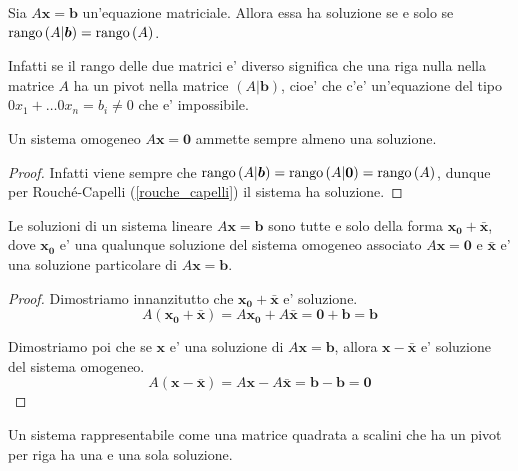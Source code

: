 \begin{theorem} \label{rouche_capelli}
    Sia $A\bm{x} = \bm b$ un'equazione matriciale. Allora essa ha soluzione se e solo se $\operatorname{rango}\left( A|\bm b \right) = \operatorname{rango}\left( A \right)$.
\end{theorem}
\begin{intuition}
    Infatti se il rango delle due matrici e' diverso significa che una riga nulla nella matrice $A$ ha un pivot nella matrice $(A|\bm b)$, cioe' che c'e' un'equazione del tipo $0x_1 + \dots 0x_n = b_i \neq 0$ che e' impossibile.
\end{intuition}

\begin{proposition}
    Un sistema omogeneo $A\bm{x} = \bm 0$ ammette sempre almeno una soluzione.
\end{proposition}
\begin{proof}
    Infatti viene sempre che $\operatorname{rango}\left( A|\bm b \right) = \operatorname{rango}\left( A|\bm 0 \right) = \operatorname{rango}\left( A \right)$, dunque per Rouché-Capelli (\ref{rouche_capelli}) il sistema ha soluzione.
\end{proof}

\begin{proposition}
    Le soluzioni di un sistema lineare $A\bm x = \bm b$ sono tutte e solo della forma $\bm{x_0} + \bm{\bar{x}}$, dove $\bm{x_0}$ e' una qualunque soluzione del sistema omogeneo associato $A\bm x = \bm 0$ e $\bm{\bar{x}}$ e' una soluzione particolare di $A\bm x = \bm b$.
\end{proposition}
\begin{proof}
    Dimostriamo innanzitutto che $\bm{x_0} + \bm{\bar{x}}$ e' soluzione.
    \[A(\bm{x_0} + \bm{\bar{x}}) = A\bm{x_0} + A\bm{\bar{x}} = \bm 0 + \bm b = \bm b\]

    Dimostriamo poi che se $\bm x$ e' una soluzione di $A\bm x = \bm b$, allora $\bm x - \bm{\bar x}$ e' soluzione del sistema omogeneo.
    \[A(\bm{x} - \bm{\bar{x}}) = A\bm{x} - A\bm{\bar{x}} = \bm b - \bm b = \bm 0\]
\end{proof}

\begin{proposition}
    Un sistema rappresentabile come una matrice quadrata a scalini che ha un pivot per riga ha una e una sola soluzione.
\end{proposition}

